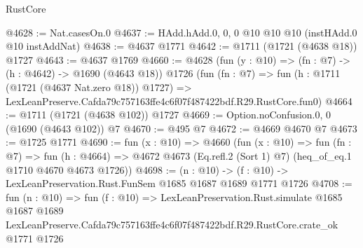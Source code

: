 \begin{lexlean}{RustCore}
\begin{coremodule}
@4628 := Nat.casesOn.{0}
@4637 := HAdd.hAdd.{0, 0, 0} @10 @10 @10 (instHAdd.{0} @10 instAddNat)
@4638 := @4637 @1771
@4642 := @1711 (@1721 (@4638 @18)) @1727
@4643 := @4637 @1769
@4660 := @4628
    (fun (y : @10) => (fn : @7) -> (h : @4642) -> @1690 (@4643 @18))
    @1726
    (fun (fn : @7) =>
    fun (h : @1711 (@1721 (@4637 Nat.zero @18)) @1727) =>
    LexLeanPreserve.Cafda79c757163ffe4c6f07f487422bdf.R29.RustCore.fun0)
@4664 := @1711 (@1721 (@4638 @102)) @1727
@4669 := Option.noConfusion.{0, 0} (@1690 (@4643 @102)) @7
@4670 := @495 @7
@4672 := @4669 @4670 @7
@4673 := @1725 @1771
@4690 := fun (x : @10) =>
  @4660
    (fun (x : @10) =>
    fun (fn : @7) =>
    fun (h : @4664) =>
    @4672 @4673 (Eq.refl.{2} (Sort 1) @7) (heq_of_eq.{1} @1710 @4670 @4673 @1726))
@4698 := (n : @10) -> (f : @10) -> LexLeanPreservation.Rust.FunSem @1685 @1687 @1689 @1771 @1726
@4708 := fun (n : @10) =>
  fun (f : @10) =>
  LexLeanPreservation.Rust.simulate
    @1685
    @1687
    @1689
    LexLeanPreserve.Cafda79c757163ffe4c6f07f487422bdf.R29.RustCore.crate_ok
    @1771
    @1726
\end{coremodule}
\end{lexlean}
